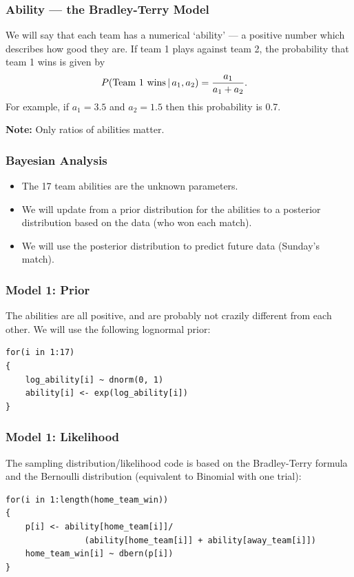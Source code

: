 \documentclass{beamer}
\newcommand{\given}{\,|\,}
\begin{document}
\begin{frame}[fragile]
\frametitle{Ability --- the Bradley-Terry Model}
We will say that each team has a numerical `ability' --- a positive number which
describes how good they are. If team 1 plays against team 2, the probability
that team 1 wins is given by
\begin{align}
P(\textnormal{Team 1 wins} \given a_1, a_2)
    &= \frac{a_1}{a_1 + a_2}.
\end{align}
For example, if $a_1 = 3.5$ and $a_2 = 1.5$ then this probability is 0.7.\pause

{\bf Note:} Only ratios of abilities matter.

\end{frame}

\begin{frame}[fragile]
\frametitle{Bayesian Analysis}
\begin{itemize}
\item The 17 team abilities are the unknown parameters. \pause
\item We will update from a prior distribution for the abilities to a posterior
distribution based on the data (who won each match).\pause
\item We will use the posterior distribution to predict future data (Sunday's
match).
\end{itemize}

\end{frame}


\begin{frame}[fragile]
\frametitle{Model 1: Prior}
The abilities are all positive, and are probably not crazily different from
each other. We will use the following lognormal prior:

\begin{verbatim}
for(i in 1:17)
{
    log_ability[i] ~ dnorm(0, 1)
    ability[i] <- exp(log_ability[i])
}
\end{verbatim}


\end{frame}


\begin{frame}[fragile]
\frametitle{Model 1: Likelihood}
The sampling distribution/likelihood code is based on the Bradley-Terry formula
and the Bernoulli distribution (equivalent to Binomial with one trial):

\begin{verbatim}
for(i in 1:length(home_team_win))
{
    p[i] <- ability[home_team[i]]/
                (ability[home_team[i]] + ability[away_team[i]])
    home_team_win[i] ~ dbern(p[i])
}
\end{verbatim}

\end{frame}
\end{document}
